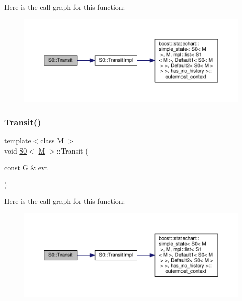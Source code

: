 Here is the call graph for this function\+:
\nopagebreak
\begin{figure}[H]
\begin{center}
\leavevmode
\includegraphics[width=350pt]{struct_s0_a6b0101df75c95bf575fd3292008a490f_cgraph}
\end{center}
\end{figure}
\mbox{\label{struct_s0_aeb846cdc6476bd9321b0d02377ec4b6c}} 
\subsubsection{\texorpdfstring{Transit()}{Transit()}\hspace{0.1cm}{\footnotesize\ttfamily [6/7]}}
{\footnotesize\ttfamily template$<$class M $>$ \\
void \mbox{\hyperlink{struct_s0}{S0}}$<$ \mbox{\hyperlink{struct_m}{M}} $>$\+::Transit (\begin{DoxyParamCaption}\item[{const \mbox{\hyperlink{struct_g}{G}} \&}]{evt }\end{DoxyParamCaption})\hspace{0.3cm}{\ttfamily [inline]}}

Here is the call graph for this function\+:
\nopagebreak
\begin{figure}[H]
\begin{center}
\leavevmode
\includegraphics[width=350pt]{struct_s0_aeb846cdc6476bd9321b0d02377ec4b6c_cgraph}
\end{center}
\end{figure}
\mbox{\label{struct_s0_a50a83097d545d19abe3a1f51c21819d1}} 

